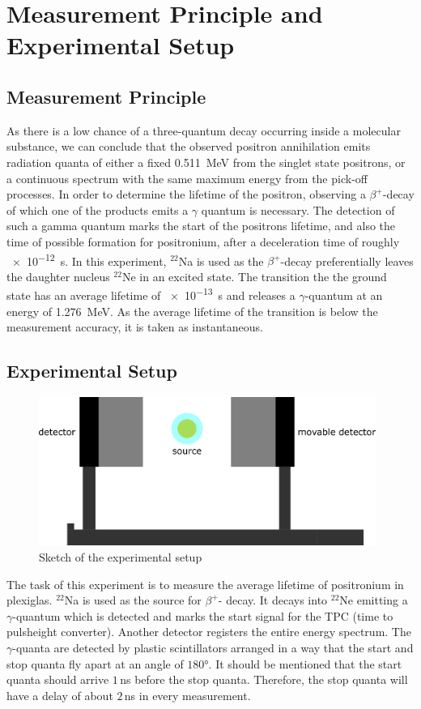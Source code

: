 \chapter{Measurement Principle and Experimental Setup}
\section{Measurement Principle}
As there is a low chance of a three-quantum decay occurring inside a molecular substance, we can conclude that the observed positron annihilation  emits radiation quanta of either a fixed \SI{0.511}{MeV} from the singlet state positrons, or a continuous spectrum with the same maximum energy from the pick-off processes.
In order to determine the lifetime of the positron, observing a $\beta^+$-decay of which one of the products emits a $\gamma$ quantum is necessary. The detection of such a gamma quantum marks the start of the positrons lifetime, and also the time of possible formation for positronium, after a deceleration time of roughly   
\SI{e-12}{s}. In this experiment, $^{22}$Na is used
as the $\beta^+$-decay preferentially leaves the daughter nucleus $^22$Ne in an excited state. The transition the the ground state has an average lifetime of \SI{e-13}{s} and releases a $\gamma$-quantum at an energy of \SI{1.276}{MeV}. As the average lifetime of the transition is below the measurement accuracy, it is taken as instantaneous. 

\section{Experimental Setup}

\begin{figure}[H]
    \centering
    \includegraphics[width=110mm,scale=0.5]{Positronium/include/positronium.png}
    \caption{Sketch of the experimental setup} 
    \label{fig:Versuchsaufbau}
\end{figure}

The task of this experiment is to measure the average lifetime of positronium in plexiglas. $^{22}$Na is used as the source for $\beta ^{+}$- decay. It decays into $^{22}$Ne emitting a $\gamma$-quantum which is detected and marks the start signal for the TPC (time to pulsheight converter). Another detector registers the entire energy spectrum. The $\gamma$-quanta are detected by plastic scintillators arranged in a way that the start and stop quanta fly apart at an angle of $180$°. It should be mentioned that the start quanta should arrive $1\,$ns before the stop quanta. Therefore, the stop quanta will have a delay of about $2$\,ns in every measurement.